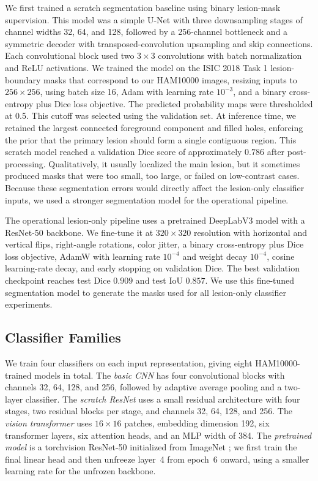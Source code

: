 \documentclass[10pt]{article}
\begin{document}
We first trained a scratch segmentation baseline using binary lesion-mask supervision. This model was a simple U-Net with three downsampling stages of channel widths 32, 64, and 128, followed by a 256-channel bottleneck and a symmetric decoder with transposed-convolution upsampling and skip connections. Each convolutional block used two $3\times3$ convolutions with batch normalization and ReLU activations. We trained the model on the ISIC 2018 Task 1 lesion-boundary masks that correspond to our HAM10000 images, resizing inputs to $256\times256$, using batch size 16, Adam with learning rate $10^{-3}$, and a binary cross-entropy plus Dice loss objective. The predicted probability maps were thresholded at 0.5. This cutoff was selected using the validation set. At inference time, we retained the largest connected foreground component and filled holes, enforcing the prior that the primary lesion should form a single contiguous region. This scratch model reached a validation Dice score of approximately $0.786$ after post-processing. Qualitatively, it usually localized the main lesion, but it sometimes produced masks that were too small, too large, or failed on low-contrast cases. Because these segmentation errors would directly affect the lesion-only classifier inputs, we used a stronger segmentation model for the operational pipeline.

The operational lesion-only pipeline uses a pretrained DeepLabV3 model with a ResNet-50 backbone. We fine-tune it at $320\times320$ resolution with horizontal and vertical flips, right-angle rotations, color jitter, a binary cross-entropy plus Dice loss objective, AdamW with learning rate $10^{-4}$ and weight decay $10^{-4}$, cosine learning-rate decay, and early stopping on validation Dice. The best validation checkpoint reaches test Dice $0.909$ and test IoU $0.857$. We use this fine-tuned segmentation model to generate the masks used for all lesion-only classifier experiments.

\subsection{Classifier Families}

We train four classifiers on each input representation, giving eight HAM10000-trained models in total. The \emph{basic CNN} has four convolutional blocks with channels 32, 64, 128, and 256, followed by adaptive average pooling and a two-layer classifier. The \emph{scratch ResNet} uses a small residual architecture \cite{he2016resnet} with four stages, two residual blocks per stage, and channels 32, 64, 128, and 256. The \emph{vision transformer} \cite{dosovitskiy2021vit} uses $16\times16$ patches, embedding dimension 192, six transformer layers, six attention heads, and an MLP width of 384. The \emph{pretrained model} is a torchvision ResNet-50 initialized from ImageNet \cite{deng2009imagenet}; we first train the final linear head and then unfreeze layer~4 from epoch~6 onward, using a smaller learning rate for the unfrozen backbone.
\end{document}
